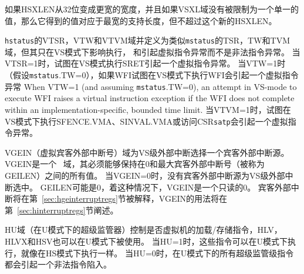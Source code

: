 如果HSXLEN从32位变成更宽的宽度，并且如果VSXL域没有被限制为一个单一的值，那么它得到的值对应于最宽的支持长度，但不超过这个新的HSXLEN。

{\tt hstatus}的VTSR，VTW和VTVM域并定义为类似{\tt mstatus}的TSR，TW和TVM域，但其只在VS模式下影响执行，
和引起虚拟指令异常而不是非法指令异常。
当VTSR=1时，试图在VS模式执行SRET引起一个虚拟指令异常。
当VTW=1时（假设{\tt mstatus}.TW=0），如果WFI试图在VS模式下执行WFI会引起一个虚拟指令异常
When VTW=1 (and assuming {\tt mstatus}.TW=0), an attempt in VS-mode to
execute WFI raises a virtual instruction exception if the WFI does not
complete within an implementation-specific, bounded time limit.
当VTVM=1时，试图在VS模式下执行SFENCE.VMA、SINVAL.VMA或访问CSR{\tt satp}会引起一个虚拟指令异常。

VGEIN（虚拟宾客外部中断号）域为VS级外部中断选择一个宾客外部中断源。
VGEIN是一个 \wlrl\ 域，其必须能够保持在0和最大宾客外部中断号（被称为GEILEN）之间的所有值。
当VGEIN=0时，没有宾客外部中断源为VS级外部中断选中。
GEILEN可能是0，着这种情况下，VGEIN是一个只读的0。
宾客外部中断将在第~\ref{sec:hgeinterruptregs}节被解释，VGEIN的用法将在第~\ref{sec:hinterruptregs}节阐述。

HU域（在U模式下的超级监管器）控制是否虚拟机的加载/存储指令，HLV，HLVX和HSV也可以在U模式下被使用。
当HU=1时，这些指令可以在U模式下执行，就像在HS模式下执行一样。
当HU=0时，在U模式下的所有超级监管级指令都会引起一个非法指令陷入。

